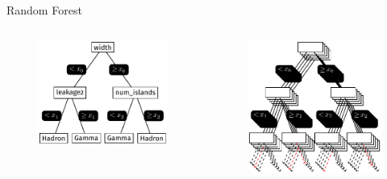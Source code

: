 \documentclass[aspectratio=1610, professionalfonts, 9pt]{beamer}
\begin{document}
\begin{frame}{Random Forest}
  \begin{columns}[onlytextwidth]
	\begin{figure}
	  \centering
	  \includegraphics[scale=1]{./tikz/Tree/Tree.pdf}
	\end{figure}
	\begin{figure}
	  \centering
	  \includegraphics[scale=1]{./tikz/RandomForest/RandomForest.pdf}
	\end{figure}
  \end{columns}
\end{frame}
\end{document}
